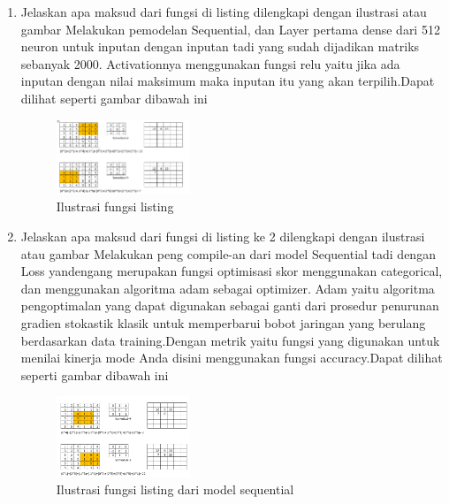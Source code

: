 \begin{enumerate}
        \item {Jelaskan apa maksud dari fungsi di listing  dilengkapi dengan ilustrasi atau gambar}
        \subitem Melakukan pemodelan Sequential, dan Layer pertama dense dari 512 neuron untuk inputan dengan inputan tadi yang sudah dijadikan matriks sebanyak 2000. Activationnya menggunakan fungsi relu yaitu jika ada inputan dengan nilai maksimum maka inputan itu yang akan terpilih.Dapat dilihat seperti gambar dibawah ini
        \begin{figure}[H]
            \includegraphics[width=4cm]{figures/1174039/chapter7/9.png}
            \centering
            \caption{Ilustrasi fungsi listing}
        \end{figure}
        \item {Jelaskan apa maksud dari fungsi di listing ke 2 dilengkapi dengan ilustrasi atau gambar}
        \subitem Melakukan peng compile-an dari model Sequential tadi dengan Loss yandengang merupakan fungsi optimisasi skor  menggunakan categorical, dan menggunakan algoritma adam sebagai optimizer. Adam yaitu algoritma pengoptimalan yang dapat digunakan sebagai ganti dari prosedur penurunan gradien stokastik klasik untuk memperbarui bobot jaringan yang berulang berdasarkan data training.Dengan metrik yaitu fungsi yang digunakan untuk menilai kinerja mode Anda disini menggunakan fungsi accuracy.Dapat dilihat seperti gambar dibawah ini
        \begin{figure}[H]
            \includegraphics[width=4cm]{figures/1174039/chapter7/10.png}
            \centering
            \caption{Ilustrasi fungsi listing dari model sequential}
        \end{figure}


\end{enumerate}
